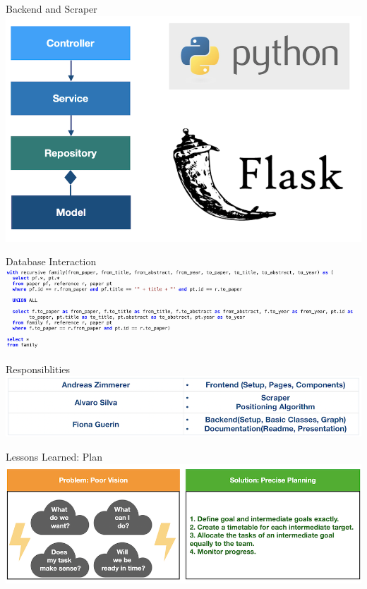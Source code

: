 \documentclass{beamer}
\begin{document}
\begin{frame}{Backend and Scraper}
    \includegraphics{img_08.png}
\end{frame}

\begin{frame}{Database Interaction}
    \includegraphics{img_09.png}
\end{frame}

\begin{frame}{Responsiblities}
    \includegraphics{img_10.png}
\end{frame}

\begin{frame}{Lessons Learned: Plan}
    \includegraphics{img_11.png}
\end{frame}
\end{document}
